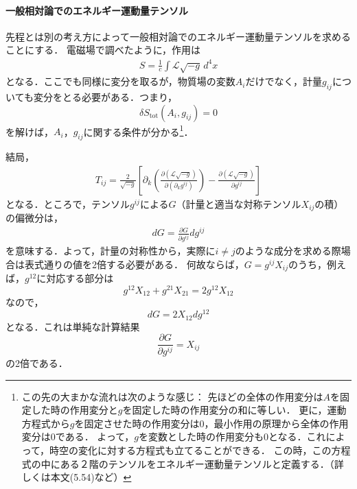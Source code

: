 \documentclass[a4paper]{ltjsreport}
\begin{document}
\paragraph{一般相対論でのエネルギー運動量テンソル}
先程とは別の考え方によって一般相対論でのエネルギー運動量テンソルを求めることにする．
電磁場で調べたように，作用は
\begin{align}
  S = \frac{1}{c}\int{}\mathcal{L}\sqrt{ - g}\,d^4x
\end{align}
となる．ここでも同様に変分を取るが，物質場の変数$A_i$だけでなく，計量$g_{ij}$についても変分をとる必要がある．つまり，
\[\delta{S}_{\text{tot}}(A_i,g_{ij})=0\]
を解けば，$A_i$，$g_{ij}$に関する条件が分かる\footnote{この先の大まかな流れは次のような感じ：
先ほどの全体の作用変分は$A$を固定した時の作用変分と$g$を固定した時の作用変分の和に等しい．
更に，運動方程式から$g$を固定させた時の作用変分は0，最小作用の原理から全体の作用変分は0である．
よって，$g$を変数とした時の作用変分も0となる．これによって，時空の変化に対する方程式も立てることができる．
この時，この方程式の中にある２階のテンソルをエネルギー運動量テンソルと定義する．（詳しくは本文(5.54)など）}．

結局，
\begin{align}
  T_{ij}=\frac{2}{\sqrt{ - g}}\left[\partial_k\left(\frac{\partial{}(\mathcal{L}\sqrt{ - g})}{\partial(\partial_k{g^{ij}})}\right) - \frac{\partial(\mathcal{L}\sqrt{ - g})}{\partial{g^{ij}}}\right]
  \label{em_ep_tensor}
\end{align}
となる．ところで，テンソル$g^{ij}$による$G$（計量と適当な対称テンソル$X_{ij}$の積）の偏微分は，
\begin{align}
  dG=\frac{\partial{G}}{\partial{g^{ij}}}dg^{ij}
\end{align}
を意味する．よって，計量の対称性から，実際に$i\neq{j}$のような成分を求める際場合は表式通りの値を2倍する必要がある．
何故ならば，$G=g^{ij}X_{ij}$のうち，例えば，$g^{12}$に対応する部分は
\[g^{12}X_{12} + g^{21}X_{21}=2g^{12}X_{12}\]
なので，
\[dG=2X_{12}dg^{12}\]
となる．これは単純な計算結果
\[\frac{\partial{}G}{\partial{g^{ij}}}=X_{ij}\]
の2倍である．
\end{document}
